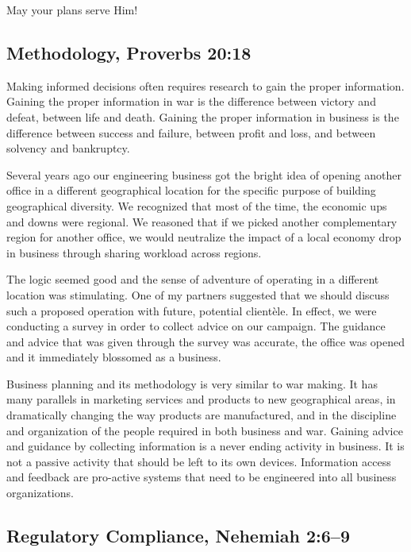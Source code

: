 \documentclass[12pt]{memoir}
\begin{document}
May your plans serve Him!


\subsection[Methodology]{Methodology, Proverbs 20:18}
  

Making informed decisions often requires research to gain the proper
information. Gaining the proper information in war is the difference
between victory and defeat, between life and death. Gaining the proper
information in business is the difference between success and failure,
between profit and loss, and between solvency and bankruptcy. 

Several years ago our engineering business got the bright
idea of opening another office in a different geographical location
for the specific purpose of building geographical diversity. We recognized that most of the time, the economic ups and downs were regional. We reasoned that if we picked another complementary region for another office, we would neutralize the impact of a local economy drop in business through sharing workload across regions.

The logic seemed good and the sense of adventure of operating in a different location was stimulating. One of my partners suggested that we should discuss such a proposed operation with future, potential clientèle. In effect, we were conducting a survey in order to collect advice on our campaign. The guidance and advice that was given through the survey was accurate, the office was opened and it immediately blossomed as a business.

Business planning and its methodology is very similar to war making.
It has many parallels in marketing services and products to new geographical areas, in dramatically changing the way products are manufactured, and in the discipline and organization of the people required in both business and war. Gaining advice and guidance by collecting information
is a never ending activity in business. It is not a passive activity
that should be left to its own devices. Information access and feedback
are pro-active systems that need to be engineered into all business
organizations. 


\subsection[Regulatory Compliance]{Regulatory Compliance, Nehemiah 2:6--9}
\end{document}

